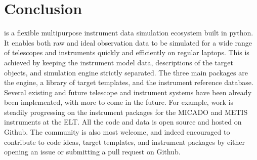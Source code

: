 

\section{Conclusion}
\label{conclusion}

\ScopeSim{} is a flexible multipurpose instrument data simulation ecosystem built in python.
It enables both raw and ideal observation data to be simulated for a wide range of telescopes and instruments quickly and efficiently on regular laptops.
This is achieved by keeping the instrument model data, descriptions of the target objects, and simulation engine strictly separated.
The three main packages are the \ScopeSim{} engine, a library of target templates, and the instrument reference database.
Several existing and future telescope and instrument systems have been already been implemented, with more to come in the future.
For example, work is steadily progressing on the instrument packages for the MICADO and METIS instruments at the ELT.
All the code and data is open source and hosted on Github.
The community is also most welcome, and indeed encouraged to contribute to code ideas, target templates, and instrument packages by either opening an issue or submitting a pull request on Github.

